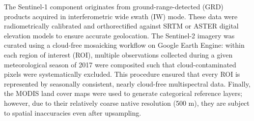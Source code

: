The Sentinel-1 component originates from ground-range-detected (GRD) products acquired in interferometric wide swath (IW) mode. These data were radiometrically calibrated and orthorectified against SRTM or ASTER digital elevation models to ensure accurate geolocation. The Sentinel-2 imagery was curated using a cloud-free mosaicking workflow on Google Earth Engine: within each region of interest (ROI), multiple observations collected during a given meteorological season of 2017 were composited such that cloud-contaminated pixels were systematically excluded. This procedure ensured that every ROI is represented by seasonally consistent, nearly cloud-free multispectral data. Finally, the MODIS land cover maps were used to generate categorical reference layers; however, due to their relatively coarse native resolution (500 m), they are subject to spatial inaccuracies even after upsampling.

